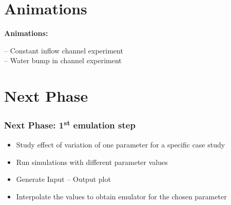 \documentclass[xcolor=dvipsnames, USenglish]{beamer}  %
\begin{document}

\section{Animations}
  {
    \begin{frame}[plain]
      \centering
      \Large{\textbf{Animations:}}\\
      \begin{flushleft}
        \Large{-- Constant inflow channel experiment}\\
        \Large{-- Water bump in channel experiment}
      \end{flushleft}
    \end{frame}
  }


\section{Next Phase}

  \begin{frame}
    \frametitle{Next Phase: 1\textsuperscript{st} emulation step}
    \begin{itemize}
      \item Study effect of variation of one parameter for a specific case study
      \item Run simulations with different parameter values
      \item Generate Input -- Output plot
      \item Interpolate the values to obtain emulator for the chosen parameter
    \end{itemize}
  \end{frame}
\end{document}

